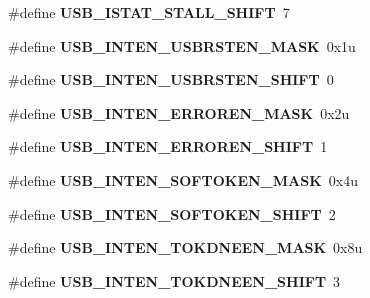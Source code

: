 \begin{DoxyCompactItemize}
\#define {\bfseries U\+S\+B\+\_\+\+I\+S\+T\+A\+T\+\_\+\+S\+T\+A\+L\+L\+\_\+\+S\+H\+I\+FT}~7
\item 
\mbox{\label{group___u_s_b___register___masks_ga67ed1b19b1fe4e25fc5ccf7bf0d42c38}} 
\#define {\bfseries U\+S\+B\+\_\+\+I\+N\+T\+E\+N\+\_\+\+U\+S\+B\+R\+S\+T\+E\+N\+\_\+\+M\+A\+SK}~0x1u
\item 
\mbox{\label{group___u_s_b___register___masks_gaf3b53207fe24da42d123d8e94494b72f}} 
\#define {\bfseries U\+S\+B\+\_\+\+I\+N\+T\+E\+N\+\_\+\+U\+S\+B\+R\+S\+T\+E\+N\+\_\+\+S\+H\+I\+FT}~0
\item 
\mbox{\label{group___u_s_b___register___masks_gaf660b76755baff6ed122be3eba21723b}} 
\#define {\bfseries U\+S\+B\+\_\+\+I\+N\+T\+E\+N\+\_\+\+E\+R\+R\+O\+R\+E\+N\+\_\+\+M\+A\+SK}~0x2u
\item 
\mbox{\label{group___u_s_b___register___masks_ga38c74121b3660065935c4f639f987b3c}} 
\#define {\bfseries U\+S\+B\+\_\+\+I\+N\+T\+E\+N\+\_\+\+E\+R\+R\+O\+R\+E\+N\+\_\+\+S\+H\+I\+FT}~1
\item 
\mbox{\label{group___u_s_b___register___masks_ga6398aff7e3278bea66900a35b616563f}} 
\#define {\bfseries U\+S\+B\+\_\+\+I\+N\+T\+E\+N\+\_\+\+S\+O\+F\+T\+O\+K\+E\+N\+\_\+\+M\+A\+SK}~0x4u
\item 
\mbox{\label{group___u_s_b___register___masks_ga8d9738dcc6d852ffd09dbac5e8058431}} 
\#define {\bfseries U\+S\+B\+\_\+\+I\+N\+T\+E\+N\+\_\+\+S\+O\+F\+T\+O\+K\+E\+N\+\_\+\+S\+H\+I\+FT}~2
\item 
\mbox{\label{group___u_s_b___register___masks_ga59b367a1e2496ad06deee9d86001aa7d}} 
\#define {\bfseries U\+S\+B\+\_\+\+I\+N\+T\+E\+N\+\_\+\+T\+O\+K\+D\+N\+E\+E\+N\+\_\+\+M\+A\+SK}~0x8u
\item 
\mbox{\label{group___u_s_b___register___masks_ga2e0c8229886bcca7e35bee00cd90d236}} 
\#define {\bfseries U\+S\+B\+\_\+\+I\+N\+T\+E\+N\+\_\+\+T\+O\+K\+D\+N\+E\+E\+N\+\_\+\+S\+H\+I\+FT}~3
\item 

\end{DoxyCompactItemize}
